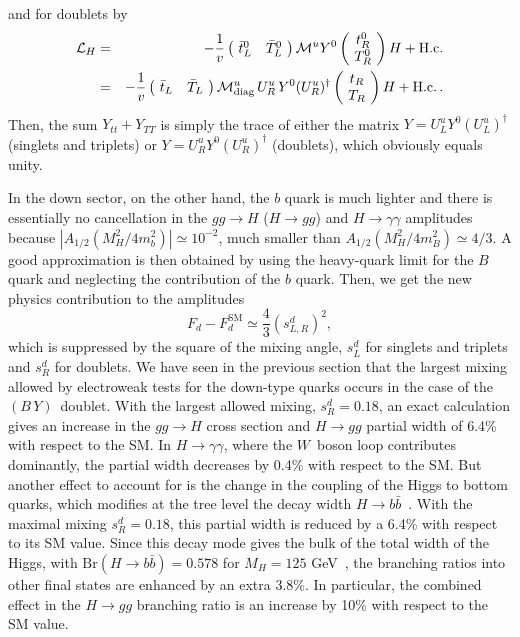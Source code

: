 \documentclass[12pt,a4paper]{article}
\newcommand{\by}{$(B\,Y)$}
\begin{document}
and for doublets by
\begin{eqnarray}
\mathcal{L}_H & = & - \frac{1}{v} \left(\! \begin{array}{cc} \bar t_L^0 & \bar T_L^0 \end{array} \!\right)
 \mathcal{M}^u Y^0
\left(\! \begin{array}{c} t^0_R \\ T^0_R \end{array}
\!\right) H + \text{H.c.} \notag \\
& = &
- \frac{1}{v} \left(\! \begin{array}{cc} \bar t_L & \bar T_L \end{array} \!\right)
\mathcal{M}^u_\text{diag} \, U_R^u \, Y^0 (U_R^u)^\dagger 
\left(\! \begin{array}{c} t_R \\ T_R \end{array}
\!\right) H + \text{H.c.} \,.
\end{eqnarray}
Then, the sum $Y_{tt}+Y_{TT}$ is simply the trace of either the matrix $Y=U_L^u Y^0 (U_L^u)^\dagger$ (singlets and triplets) or $Y=U_R^u Y^0 (U_R^u)^\dagger$ (doublets), which obviously equals unity.

In the down sector, on the other hand, the $b$ quark is much lighter and there is essentially no cancellation in the $gg\to H$ ($H \to gg$) and $H \to \gamma \gamma$ amplitudes because $|A_{1/2}(M_H^2/4 m_b^2)| \simeq 10^{-2}$, much smaller than $A_{1/2}(M_H^2/4 m_B^2) \simeq 4/3$. A good approximation is then obtained by using the heavy-quark limit for the $B$ quark and neglecting the contribution of the $b$ quark. Then, we get the new physics contribution to the amplitudes
\begin{equation}
F_d-F_d^\mathrm{SM}  \simeq \frac{4}{3} (s^d_{L,R})^2, 
\end{equation}
which is suppressed by the square of the mixing angle, $s^d_L$ for singlets and triplets and $s^d_R$ for doublets. We have seen in the previous section that the largest mixing allowed by electroweak tests for the down-type quarks occurs in the case of the \by\ doublet. With the largest allowed mixing, $s^d_R=0.18$, an exact calculation gives an increase in the $gg\to H$ cross section and $H \to gg$ partial width of 6.4\% with respect to the SM. In $H \to \gamma \gamma$, where the $W$~boson loop contributes dominantly, the partial width decreases by 0.4\% with respect to the SM. But another effect to account for is the change in the coupling of the Higgs to bottom quarks, which modifies at the tree level the decay width $H \to b \bar{b}$~\cite{Kearney:2012zi}. With the maximal mixing $s^d_R=0.18$, this partial width is reduced by a 6.4\% with respect to its SM value. Since this decay mode gives the bulk of the total width of the Higgs, with $\text{Br}(H \to b \bar b) = 0.578$ for $M_H=125$ GeV~\cite{Denner:2011mq,Dittmaier:2012vm}, the branching ratios into other final states are enhanced by an extra 3.8\%. In particular, the combined effect in the $H \to gg$ branching ratio is an increase by 10\% with respect to the SM value.
\end{document}
